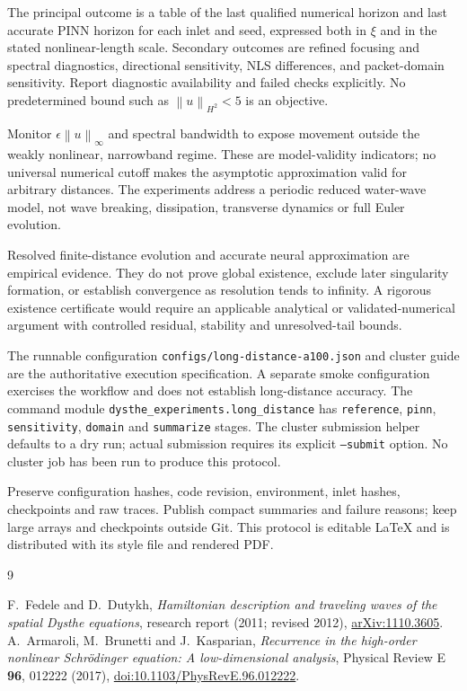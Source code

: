 \documentclass[11pt]{article}
\newcommand{\norm}[1]{\left\lVert #1\right\rVert}
\begin{document}
The principal outcome is a table of the last qualified numerical horizon and
last accurate PINN horizon for each inlet and seed, expressed both in \(\xi\)
and in the stated nonlinear-length scale. Secondary outcomes are refined
focusing and spectral diagnostics, directional sensitivity, NLS differences,
and packet-domain sensitivity. Report diagnostic availability and failed checks
explicitly. No predetermined bound such as \(\norm{u}_{H^2}<5\) is an objective.

Monitor \(\epsilon\norm{u}_\infty\) and spectral bandwidth to expose movement
outside the weakly nonlinear, narrowband regime. These are model-validity
indicators; no universal numerical cutoff makes the asymptotic approximation
valid for arbitrary distances. The experiments address a periodic reduced
water-wave model, not wave breaking, dissipation, transverse dynamics or
full Euler evolution.

\begin{remark}
Resolved finite-distance evolution and accurate neural approximation are
empirical evidence. They do not prove global existence, exclude later
singularity formation, or establish convergence as resolution tends to
infinity. A rigorous existence certificate would require an applicable
analytical or validated-numerical argument with controlled residual,
stability and unresolved-tail bounds.
\end{remark}

The runnable configuration \texttt{configs/long-distance-a100.json} and cluster
guide are the authoritative execution specification. A separate smoke
configuration exercises the workflow and does not establish long-distance
accuracy. The command module \texttt{dysthe\_experiments.long\_distance} has
\texttt{reference}, \texttt{pinn}, \texttt{sensitivity}, \texttt{domain} and
\texttt{summarize} stages. The cluster submission helper defaults to a dry run;
actual submission requires its explicit \texttt{--submit} option. No cluster
job has been run to produce this protocol.

Preserve configuration hashes, code revision, environment, inlet hashes,
checkpoints and raw traces. Publish compact summaries and failure reasons;
keep large arrays and checkpoints outside Git. This protocol is editable
LaTeX and is distributed with its style file and rendered PDF.

\begin{thebibliography}{9}
\raggedright
{} F.~Fedele and D.~Dutykh, \emph{Hamiltonian description and
traveling waves of the spatial Dysthe equations}, research report (2011;
revised 2012), \href{https://arxiv.org/abs/1110.3605}{arXiv:1110.3605}.
 A.~Armaroli, M.~Brunetti and J.~Kasparian,
\emph{Recurrence in the high-order nonlinear Schr\"odinger equation:
A low-dimensional analysis}, Physical Review E \textbf{96}, 012222 (2017),
\href{https://doi.org/10.1103/PhysRevE.96.012222}{doi:10.1103/PhysRevE.96.012222}.
\end{thebibliography}
\end{document}
